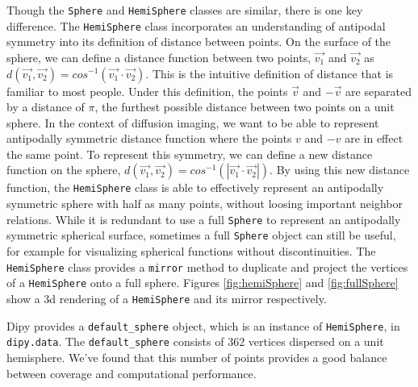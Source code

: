 Though the \verb|Sphere| and \verb|HemiSphere| classes are similar, there is one key difference. The \verb|HemiSphere| class incorporates an understanding of antipodal symmetry into its definition of distance between points. On the surface of the sphere, we can define a distance function between two points, $\vec{v_1}$ and $\vec{v_2}$ as $d(\vec{v_1}, \vec{v_2}) = cos^{-1}(\vec{v_1} \cdot \vec{v_2})$. This is the intuitive definition of distance that is familiar to most people. Under this definition, the points $\vec{v}$ and $-\vec{v}$ are separated by a distance of $\pi$, the furthest possible distance between two points on a unit sphere. In the context of diffusion imaging, we want to be able to represent antipodally symmetric distance function where the points $v$ and $-v$ are in effect the same point. To represent this symmetry, we can define a new distance function on the sphere, $d(\vec{v_1}, \vec{v_2}) = cos^{-1}(|\vec{v_1} \cdot \vec{v_2}|)$. By using this new distance function, the \verb|HemiSphere| class is able to effectively represent an antipodally symmetric sphere with half as many points, without loosing important neighbor relations. While it is redundant to use a full \verb|Sphere| to represent an antipodally symmetric spherical surface, sometimes a full \verb|Sphere| object can still be useful, for example for visualizing spherical functions without discontinuities. The \verb|HemiSphere| class provides a \verb|mirror| method to duplicate and project the vertices of a \verb|HemiSphere| onto a full sphere. Figures \ref{fig:hemiSphere} and \ref{fig:fullSphere} show a 3d rendering of a \verb|HemiSphere| and its mirror respectively.

Dipy provides a \verb|default_sphere| object, which is an instance of \verb|HemiSphere|, in \verb|dipy.data|. The \verb|default_sphere| consists of 362 vertices dispersed on a unit hemisphere. We've found that this number of points provides a good balance between coverage and computational performance.